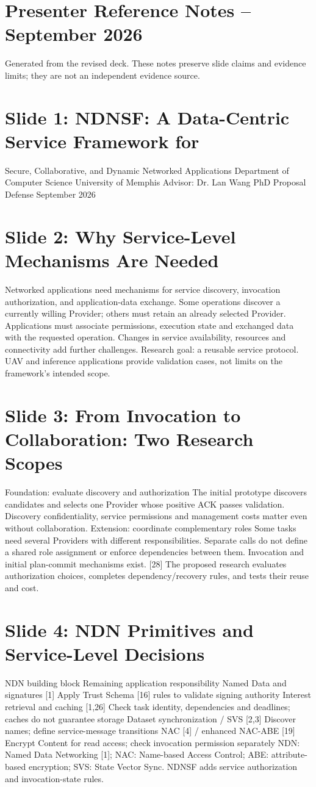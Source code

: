 \documentclass[11pt]{article}
\newcommand{\slideentry}[3]{\section*{Slide #1: #2}#3\par}
\begin{document}
\section*{Presenter Reference Notes -- September 2026}
Generated from the revised deck. These notes preserve slide claims and evidence limits; they are not an independent evidence source.
\slideentry{1}{NDNSF: A Data-Centric Service Framework for}{
Secure, Collaborative, and Dynamic Networked Applications Department of Computer Science University of Memphis Advisor: Dr. Lan Wang PhD Proposal Defense September 2026
}
\slideentry{2}{Why Service-Level Mechanisms Are Needed}{
Networked applications need mechanisms for service discovery, invocation authorization, and application-data exchange. Some operations discover a currently willing Provider; others must retain an already selected Provider. Applications must associate permissions, execution state and exchanged data with the requested operation. Changes in service availability, resources and connectivity add further challenges. Research goal: a reusable service protocol. UAV and inference applications provide validation cases, not limits on the framework’s intended scope.
}
\slideentry{3}{From Invocation to Collaboration: Two Research Scopes}{
Foundation: evaluate discovery and authorization The initial prototype discovers candidates and selects one Provider whose positive ACK passes validation. Discovery confidentiality, service permissions and management costs matter even without collaboration. Extension: coordinate complementary roles Some tasks need several Providers with different responsibilities. Separate calls do not define a shared role assignment or enforce dependencies between them. Invocation and initial plan-commit mechanisms exist. [28] The proposed research evaluates authorization choices, completes dependency/recovery rules, and tests their reuse and cost.
}
\slideentry{4}{NDN Primitives and Service-Level Decisions}{
NDN building block Remaining application responsibility Named Data and signatures [1] Apply Trust Schema [16] rules to validate signing authority Interest retrieval and caching [1,26] Check task identity, dependencies and deadlines; caches do not guarantee storage Dataset synchronization / SVS [2,3] Discover names; define service-message transitions NAC [4] / enhanced NAC-ABE [19] Encrypt Content for read access; check invocation permission separately NDN: Named Data Networking [1]; NAC: Name-based Access Control; ABE: attribute-based encryption; SVS: State Vector Sync. NDNSF adds service authorization and invocation-state rules.
}
\end{document}
